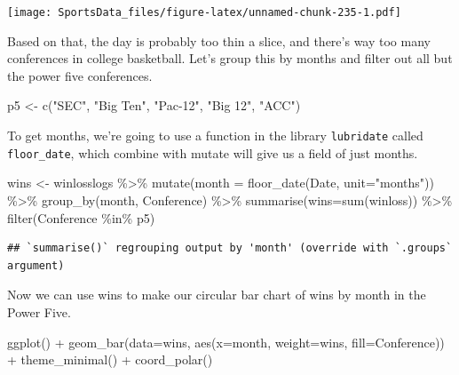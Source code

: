 \documentclass[
]{book}
\newenvironment{Shaded}{\begin{snugshade}}{\end{snugshade}}
\newcommand{\AttributeTok}[1]{\textcolor[rgb]{0.77,0.63,0.00}{#1}}
\newcommand{\FunctionTok}[1]{\textcolor[rgb]{0.00,0.00,0.00}{#1}}
\newcommand{\NormalTok}[1]{#1}
\newcommand{\OtherTok}[1]{\textcolor[rgb]{0.56,0.35,0.01}{#1}}
\newcommand{\SpecialCharTok}[1]{\textcolor[rgb]{0.00,0.00,0.00}{#1}}
\newcommand{\StringTok}[1]{\textcolor[rgb]{0.31,0.60,0.02}{#1}}
\begin{document}
\texttt{[image: SportsData\_files/figure-latex/unnamed-chunk-235-1.pdf]}

Based on that, the day is probably too thin a slice, and there's way too many conferences in college basketball. Let's group this by months and filter out all but the power five conferences.

\begin{Shaded}
\begin{Highlighting}[]
\NormalTok{p5 }\OtherTok{\textless{}{-}} \FunctionTok{c}\NormalTok{(}\StringTok{"SEC"}\NormalTok{, }\StringTok{"Big Ten"}\NormalTok{, }\StringTok{"Pac{-}12"}\NormalTok{, }\StringTok{"Big 12"}\NormalTok{, }\StringTok{"ACC"}\NormalTok{)}
\end{Highlighting}
\end{Shaded}

To get months, we're going to use a function in the library \texttt{lubridate} called \texttt{floor\_date}, which combine with mutate will give us a field of just months.

\begin{Shaded}
\begin{Highlighting}[]
\NormalTok{wins }\OtherTok{\textless{}{-}}\NormalTok{ winlosslogs }\SpecialCharTok{\%\textgreater{}\%} \FunctionTok{mutate}\NormalTok{(}\AttributeTok{month =} \FunctionTok{floor\_date}\NormalTok{(Date, }\AttributeTok{unit=}\StringTok{"months"}\NormalTok{)) }\SpecialCharTok{\%\textgreater{}\%} \FunctionTok{group\_by}\NormalTok{(month, Conference) }\SpecialCharTok{\%\textgreater{}\%} \FunctionTok{summarise}\NormalTok{(}\AttributeTok{wins=}\FunctionTok{sum}\NormalTok{(winloss)) }\SpecialCharTok{\%\textgreater{}\%} \FunctionTok{filter}\NormalTok{(Conference }\SpecialCharTok{\%in\%}\NormalTok{ p5) }
\end{Highlighting}
\end{Shaded}

\begin{verbatim}
## `summarise()` regrouping output by 'month' (override with `.groups` argument)
\end{verbatim}

Now we can use wins to make our circular bar chart of wins by month in the Power Five.

\begin{Shaded}
\begin{Highlighting}[]
\FunctionTok{ggplot}\NormalTok{() }\SpecialCharTok{+} \FunctionTok{geom\_bar}\NormalTok{(}\AttributeTok{data=}\NormalTok{wins, }\FunctionTok{aes}\NormalTok{(}\AttributeTok{x=}\NormalTok{month, }\AttributeTok{weight=}\NormalTok{wins, }\AttributeTok{fill=}\NormalTok{Conference)) }\SpecialCharTok{+} \FunctionTok{theme\_minimal}\NormalTok{() }\SpecialCharTok{+} \FunctionTok{coord\_polar}\NormalTok{()}
\end{Highlighting}
\end{Shaded}
\end{document}
